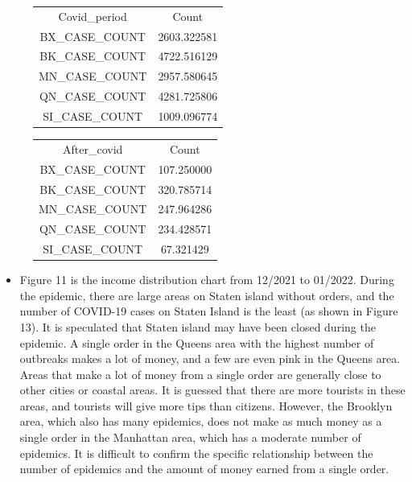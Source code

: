 \documentclass[11pt]{article}
\begin{document}
\begin{figure}[H]
  \begin{minipage}[b]{0.5\textwidth} 
    \centering
    \begin{tabular}{c|c} \hline
    Covid\_period & Count \\
    BX\_CASE\_COUNT &	2603.322581 \\
    BK\_CASE\_COUNT &	4722.516129 \\
    MN\_CASE\_COUNT &	2957.580645 \\
    QN\_CASE\_COUNT &	4281.725806 \\
    SI\_CASE\_COUNT & 1009.096774 \\
    \hline
    \end{tabular} 
    \caption{}
    \label{tab:my_label}
  \end{minipage}%
  \begin{minipage}[b]{0.5\textwidth} 
    \centering 
    \begin{tabular}{c|c} \hline
    After\_covid & Count \\
    BX\_CASE\_COUNT &	107.250000 \\
    BK\_CASE\_COUNT &	320.785714 \\
    MN\_CASE\_COUNT &	247.964286 \\
    QN\_CASE\_COUNT &	234.428571 \\
    SI\_CASE\_COUNT & 67.321429 \\
    \hline
    \end{tabular} 
    \caption{}
    \label{tab:my_label}
\end{minipage} 
\end{figure}
\begin{itemize}
    \item Figure 11 is the income distribution chart from 12/2021 to 01/2022. During the epidemic, there are large areas on Staten island without orders, and the number of COVID-19 cases on Staten Island is the least (as shown in Figure 13). It is speculated that Staten island may have been closed during the epidemic. A single order in the Queens area with the highest number of outbreaks makes a lot of money, and a few are even pink in the Queens area. Areas that make a lot of money from a single order are generally close to other cities or coastal areas. It is guessed that there are more tourists in these areas, and tourists will give more tips than citizens. However, the Brooklyn area, which also has many epidemics, does not make as much money as a single order in the Manhattan area, which has a moderate number of epidemics. It is difficult to confirm the specific relationship between the number of epidemics and the amount of money earned from a single order.
\end{itemize}
\end{document}
